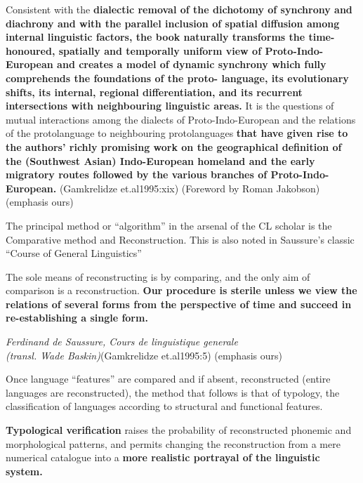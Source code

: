 \begin{myquote}
Consistent with the \textbf{dialectic removal of the dichotomy of synchrony and diachrony and with the parallel inclusion of spatial diffusion among internal linguistic factors, the book naturally transforms the time-honoured, spatially and temporally uniform view of Proto-Indo-European and creates a model of dynamic synchrony which fully comprehends the foundations of the proto- language, its evolutionary shifts, its internal, regional differentiation, and its recurrent intersections with neighbouring linguistic areas.} It is the questions of mutual interactions among the dialects of Proto-Indo-European and the relations of the protolanguage to neighbouring protolanguages \textbf{that have given rise to the authors' richly promising work on the geographical definition of the (Southwest Asian) Indo-European homeland and the early migratory routes followed by the various branches of Proto-Indo-European.} (Gamkrelidze et.al1995:xix) (Foreword by Roman Jakobson) (emphasis ours)
\end{myquote}

The principal method or “algorithm” in the arsenal of the CL scholar is the Comparative method and Reconstruction. This is also noted in Saussure’s classic “Course of General Linguistics”

\begin{myquote}
The sole means of reconstructing is by comparing, and the only aim of comparison is a reconstruction. \textbf{Our procedure is sterile unless we view the relations of several forms from the perspective of time and succeed in re-establishing a single form.}
\end{myquote}

\begin{myquote}
\textit{Ferdinand de Saussure, Cours de linguistique generale}\\\textit{(transl. Wade Baskin)}(Gamkrelidze et.al1995:5) (emphasis ours)
\end{myquote}

Once language “features” are compared and if absent, reconstructed (entire languages are reconstructed), the method that follows is that of typology, the classification of languages according to structural and functional features.

\begin{myquote}
\textbf{Typological verification} raises the probability of reconstructed phonemic and morphological patterns, and permits changing the reconstruction from a mere numerical catalogue into a \textbf{more realistic portrayal of the linguistic system.}
\end{myquote}

